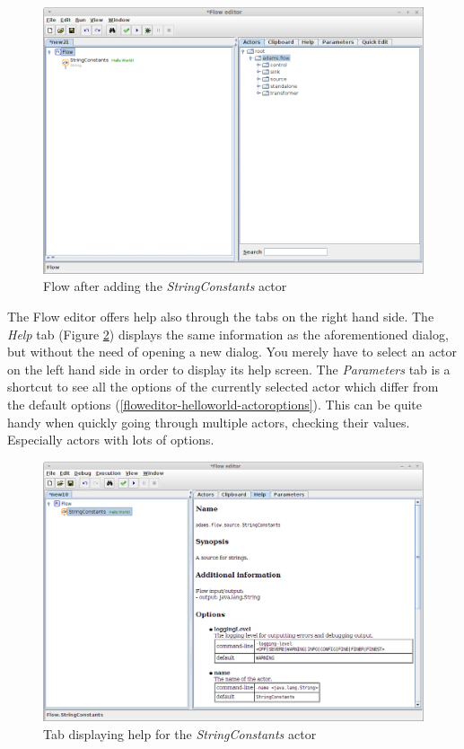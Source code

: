 \begin{figure}[htb]
  \centering
  \includegraphics[width=12.0cm]{images/floweditor-helloworld-addactor5.png}
  \caption{Flow after adding the \textit{StringConstants} actor}
  \label{floweditor-helloworld-addactor5}
\end{figure}

The Flow editor offers help also through the tabs on the right hand side. The
\textit{Help} tab (Figure \ref{floweditor-helloworld-actorhelp-tab}) displays
the same information as the aforementioned dialog, but without the need of
opening a new dialog. You merely have to select an actor on the left hand side
in order to display its help screen. The \textit{Parameters} tab is a shortcut
to see all the options of the currently selected actor which differ from the
default options (\ref{floweditor-helloworld-actoroptions}). This can be quite
handy when quickly going through multiple actors, checking their values.
Especially actors with lots of options.

\begin{figure}[htb]
  \centering
  \includegraphics[width=12.0cm]{images/floweditor-helloworld-actorhelp-tab.png}
  \caption{Tab displaying help for the \textit{StringConstants} actor}
  \label{floweditor-helloworld-actorhelp-tab}
\end{figure}

